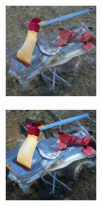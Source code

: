 \documentclass{article}
\begin{document}
\begin{figure}
    \centering
    
    \begin{subfigure}[b]{0.5\linewidth}
        \begin{subfigure}[b]{0.242\linewidth}
        \includegraphics[width=\linewidth]{figures/imagenet128/solver_samples/imagenet128_fm_ot_17_05.png}
        \end{subfigure}%
        \begin{subfigure}[b]{0.242\linewidth}
        \includegraphics[width=\linewidth]{figures/imagenet128/solver_samples/imagenet128_fm_ot_17_10.png}

\end{subfigure}
\end{subfigure}
\end{figure}
\end{document}
